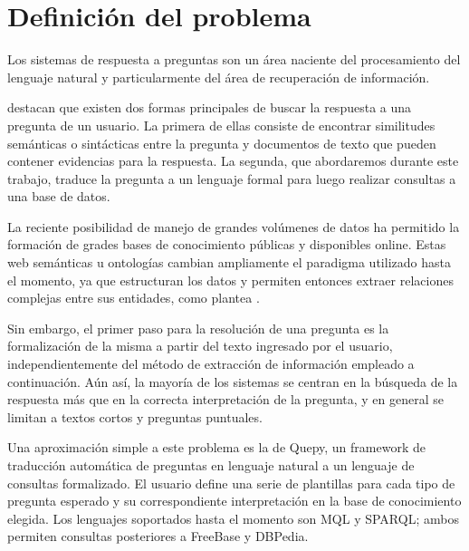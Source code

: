 
\section{Definición del problema}
Los sistemas de respuesta a preguntas son un área naciente del procesamiento del lenguaje natural y particularmente del área de recuperación de información.

\citet{gupta_survey} destacan que existen dos formas principales de buscar la respuesta a una pregunta de un usuario. La primera de ellas consiste de encontrar similitudes semánticas o sintácticas entre la pregunta y documentos de texto que pueden contener evidencias para la respuesta. La segunda, que abordaremos durante este trabajo, traduce la pregunta a un lenguaje formal para luego realizar consultas a una base de datos.

La reciente posibilidad de manejo de grandes volúmenes de datos ha permitido la formación de grades bases de conocimiento públicas y disponibles online. Estas web semánticas u ontologías cambian ampliamente el paradigma utilizado hasta el momento, ya que estructuran los datos y permiten entonces extraer relaciones complejas entre sus entidades, como plantea \citet{ou_entailement}.

Sin embargo, el primer paso para la resolución de una pregunta es la formalización de la misma a partir del texto ingresado por el usuario, independientemente del método de extracción de información empleado a continuación. Aún así, la mayoría de los sistemas se centran en la búsqueda de la respuesta más que en la correcta interpretación de la pregunta, y en general se limitan a textos cortos y preguntas puntuales.

Una aproximación simple a este problema es la de Quepy, un framework de traducción automática de preguntas en lenguaje natural a un lenguaje de consultas formalizado. El usuario define una serie de plantillas para cada tipo de pregunta esperado y su correspondiente interpretación en la base de conocimiento elegida. Los lenguajes soportados hasta el momento son MQL y SPARQL; ambos permiten consultas posteriores a FreeBase y DBPedia.

